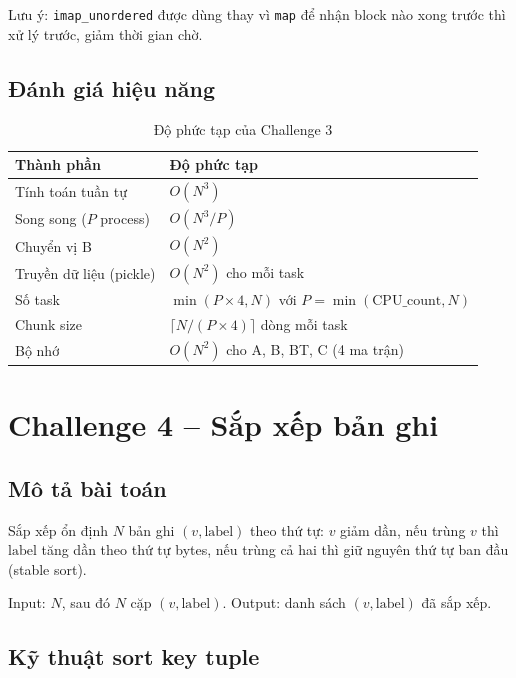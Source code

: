 \documentclass[12pt,a4paper]{article}
\begin{document}
Lưu ý: \texttt{imap\_unordered} được dùng thay vì \texttt{map} để nhận block nào xong trước thì xử lý trước, giảm thời gian chờ.

\subsection{Đánh giá hiệu năng}

\begin{table}[H]
\centering
\caption{Độ phức tạp của Challenge 3}
\begin{tabularx}{\textwidth}{p{4.5cm}Y}
\toprule
\textbf{Thành phần} & \textbf{Độ phức tạp} \\
\midrule
Tính toán tuần tự & $O(N^3)$ \\
Song song ($P$ process) & $O(N^3 / P)$ \\
\midrule
\midrule
Chuyển vị B & $O(N^2)$ \\
Truyền dữ liệu (pickle) & $O(N^2)$ cho mỗi task \\
\midrule
\midrule
Số task & $\min(P \times 4, N)$ với $P = \min(\text{CPU\_count}, N)$ \\
Chunk size & $\lceil N / (P \times 4) \rceil$ dòng mỗi task \\
\midrule
\midrule
Bộ nhớ & $O(N^2)$ cho A, B, BT, C (4 ma trận) \\
\bottomrule
\end{tabularx}
\end{table}

\section{Challenge 4 -- Sắp xếp bản ghi}

\subsection{Mô tả bài toán}

Sắp xếp ổn định $N$ bản ghi $(v, \text{label})$ theo thứ tự: $v$ giảm dần, nếu trùng $v$ thì $\text{label}$ tăng dần theo thứ tự bytes, nếu trùng cả hai thì giữ nguyên thứ tự ban đầu (stable sort).

Input: $N$, sau đó $N$ cặp $(v, \text{label})$. Output: danh sách $(v, \text{label})$ đã sắp xếp.

\subsection{Kỹ thuật sort key tuple}
\end{document}
